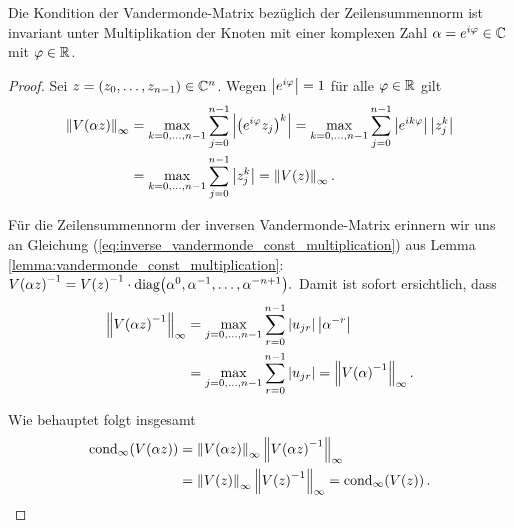\begin{lemma}
    \label{lemma:vandermonde_rotation_invariance}
    Die Kondition der Vandermonde-Matrix bezüglich der Zeilensummennorm ist
    invariant unter Multiplikation der Knoten mit einer komplexen Zahl
    $\alpha = e^{i\varphi} \in \mathbb{C}$ mit $\varphi \in \mathbb{R}$.
\end{lemma}
\begin{proof}
    Sei $z = (z_0, \dots, z_{n-1}) \in \mathbb{C}^n$.
    Wegen $\left\lvert e^{i\varphi} \right\rvert = 1$ für alle $\varphi \in \mathbb{R}$ gilt
    \[
        \begin{split}
            \left\lVert V \! \left( \alpha z \right) \right\rVert_\infty
            &= \max_{k=0, \dots, n-1} \sum_{j=0}^{n-1} \left\lvert \left(e^{i\varphi} z_j\right)^k \right\rvert
            = \max_{k=0, \dots, n-1} \sum_{j=0}^{n-1} \left\lvert e^{ik\varphi} \right\rvert \left\lvert z_j^k \right\rvert\\
            &= \max_{k=0, \dots, n-1} \sum_{j=0}^{n-1} \left\lvert z_j^k \right\rvert
            = \left\lVert V \! \left( z \right) \right\rVert_\infty.
        \end{split}
    \]

    \noindent Für die Zeilensummennorm der inversen Vandermonde-Matrix erinnern
    wir uns an Gleichung
    (\ref{eq:inverse_vandermonde_const_multiplication})
    aus Lemma \ref{lemma:vandermonde_const_multiplication}:
        $V \! \left( \alpha z \right)^{-1}
        = V \! \left( z \right)^{-1} \cdot \text{diag$ \left( \alpha^0, \alpha^{-1}, \dots, \alpha^{-n+1} \right)$}.$
    Damit ist sofort ersichtlich, dass
    \[
        \begin{split}
            \left\lVert V \! \left( \alpha z \right)^{-1} \right\rVert_\infty
            &= \max_{j=0, \dots, n-1} \sum_{r=0}^{n-1} \left\lvert u_{jr} \right\rvert \left\lvert \alpha^{-r} \right\rvert\\
            &= \max_{j=0, \dots, n-1} \sum_{r=0}^{n-1} \left\lvert u_{jr} \right\rvert
            = \left\lVert V \! \left( \alpha \right)^{-1} \right\rVert_\infty.
        \end{split}
    \]

    \noindent Wie behauptet folgt insgesamt
    \[
        \begin{split}
            \cond[\infty]{\Vand{\alpha z}}
            &= \norm{\Vand{\alpha z}}_\infty \norm{\Vand{\alpha z}^{-1}}_\infty\\
            &= \norm{\Vand{z}}_\infty \norm{\Vand{z}^{-1}}_\infty
            = \cond[\infty]{\Vand{z}}.
        \end{split}
    \]
\end{proof}

